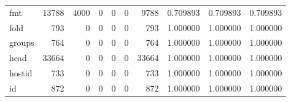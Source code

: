 \begin{longtable}{lrrrrrrrrr}
fmt       &                                              13788 &                                               4000 &                                                  0 &                                                  0 &                                                  0 &                                               9788 &                                           0.709893 &                               0.709893 &                             0.709893 \\
fold      &                                                793 &                                                  0 &                                                  0 &                                                  0 &                                                  0 &                                                793 &                                           1.000000 &                               1.000000 &                             1.000000 \\
groups    &                                                764 &                                                  0 &                                                  0 &                                                  0 &                                                  0 &                                                764 &                                           1.000000 &                               1.000000 &                             1.000000 \\
head      &                                              33664 &                                                  0 &                                                  0 &                                                  0 &                                                  0 &                                              33664 &                                           1.000000 &                               1.000000 &                             1.000000 \\
hostid    &                                                733 &                                                  0 &                                                  0 &                                                  0 &                                                  0 &                                                733 &                                           1.000000 &                               1.000000 &                             1.000000 \\
id        &                                                872 &                                                  0 &                                                  0 &                                                  0 &                                                  0 &                                                872 &                                           1.000000 &                               1.000000 &                             1.000000 \\

\end{longtable}
